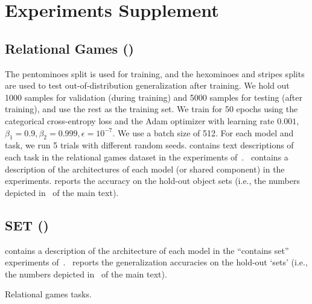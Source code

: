 \section{Experiments Supplement}\label{sec:experiments_supplement}

\subsection{Relational Games ()}

The pentominoes split is used for training,
and the hexominoes and stripes splits are used to test out-of-distribution generalization after training. We hold out 1000 samples for validation (during training) and 5000 samples for testing (after training), and use the rest as the training set. We train for 50 epochs using the categorical cross-entropy loss and the Adam optimizer with learning rate $0.001$, $\beta_1 = 0.9, \beta_2 = 0.999, \epsilon = 10^{-7}$. We use a batch size of 512. For each model and task, we run 5 trials with different random seeds. contains text descriptions of each task in the relational games dataset in the experiments of~.~ contains a description of the architectures of each model (or shared component) in the experiments.
 reports the accuracy on the hold-out object sets (i.e., the numbers depicted in~ of the main text).

\subsection{SET ()}

 contains a description of the architecture of each model in the ``contains set'' experiments of~.~ reports the generalization accuracies on the hold-out `sets' (i.e., the numbers depicted in~ of the main text).

\begin{table}[H]
    \centering
    
    \caption{Relational games tasks.}\label{tab:relational_games_tasks}
\end{table}

